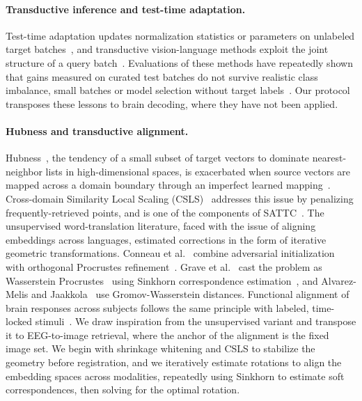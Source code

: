 \documentclass[10pt,twocolumn,letterpaper]{article}
\begin{document}
\paragraph{Transductive inference and test-time adaptation.}
Test-time adaptation updates normalization statistics or parameters on unlabeled target batches~\cite{li2018adabn,wang2021tent,liang2020shot,iwasawa2021t3a}, and transductive vision-language methods exploit the joint structure of a query batch~\cite{martin2024transductive,zanella2024transclip}. Evaluations of these methods have repeatedly shown that gains measured on curated test batches do not survive realistic class imbalance, small batches or model selection without target labels~\cite{veilleux2021realistic,zhao2023pitfalls}. Our protocol transposes these lessons to brain decoding, where they have not been applied.

\paragraph{Hubness and transductive alignment.}
Hubness~\cite{radovanovic2010hubs}, the tendency of a small subset of target vectors to dominate nearest-neighbor lists in high-dimensional spaces, is exacerbated when source vectors are mapped across a domain boundary through an imperfect learned mapping~\cite{dinu2015hubness}.
Cross-domain Similarity Local Scaling (CSLS)~\cite{conneau2018muse} addresses this issue by penalizing frequently-retrieved points, and is one of the components of SATTC~\cite{huang2026sattc}.
The unsupervised word-translation literature, faced with the issue of aligning embeddings across languages, estimated corrections in the form of iterative geometric transformations.
Conneau et al.~\cite{conneau2018muse} combine adversarial initialization with orthogonal Procrustes refinement~\cite{schonemann1966procrustes}. Grave et al.~\cite{grave2019wasserstein} cast the problem as Wasserstein Procrustes~\cite{peyre2019computational} using Sinkhorn correspondence estimation~\cite{cuturi2013sinkhorn}, and Alvarez-Melis and Jaakkola~\cite{alvarezmelis2018gromov} use Gromov-Wasserstein distances. Functional alignment of brain responses across subjects follows the same principle with labeled, time-locked stimuli~\cite{haxby2011common,chen2015srm,scotti2024mindeye2}.
We draw inspiration from the unsupervised variant and transpose it to EEG-to-image retrieval, where the anchor of the alignment is the fixed image set. We begin with shrinkage whitening and CSLS to stabilize the geometry before registration, and we iteratively estimate rotations to align the embedding spaces across modalities, repeatedly using Sinkhorn to estimate soft correspondences, then solving for the optimal rotation.
\end{document}
